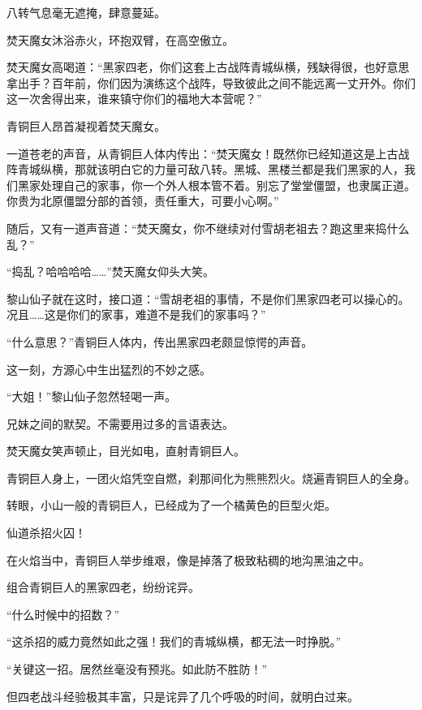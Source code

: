 
\begin{this_body}

八转气息毫无遮掩，肆意蔓延。

焚天魔女沐浴赤火，环抱双臂，在高空傲立。

焚天魔女高喝道：“黑家四老，你们这套上古战阵青城纵横，残缺得很，也好意思拿出手？百年前，你们因为演练这个战阵，导致彼此之间不能远离一丈开外。你们这一次舍得出来，谁来镇守你们的福地大本营呢？”

青铜巨人昂首凝视着焚天魔女。

一道苍老的声音，从青铜巨人体内传出：“焚天魔女！既然你已经知道这是上古战阵青城纵横，那就该明白它的力量可敌八转。黑城、黑楼兰都是我们黑家的人，我们黑家处理自己的家事，你一个外人根本管不着。别忘了堂堂僵盟，也隶属正道。你贵为北原僵盟分部的首领，责任重大，可要小心啊。”

随后，又有一道声音道：“焚天魔女，你不继续对付雪胡老祖去？跑这里来捣什么乱？”

“捣乱？哈哈哈哈……”焚天魔女仰头大笑。

黎山仙子就在这时，接口道：“雪胡老祖的事情，不是你们黑家四老可以操心的。况且……这是你们的家事，难道不是我们的家事吗？”

“什么意思？”青铜巨人体内，传出黑家四老颇显惊愕的声音。

这一刻，方源心中生出猛烈的不妙之感。

“大姐！”黎山仙子忽然轻喝一声。

兄妹之间的默契。不需要用过多的言语表达。

焚天魔女笑声顿止，目光如电，直射青铜巨人。

青铜巨人身上，一团火焰凭空自燃，刹那间化为熊熊烈火。烧遍青铜巨人的全身。

转眼，小山一般的青铜巨人，已经成为了一个橘黄色的巨型火炬。

仙道杀招火囚！

在火焰当中，青铜巨人举步维艰，像是掉落了极致粘稠的地沟黑油之中。

组合青铜巨人的黑家四老，纷纷诧异。

“什么时候中的招数？”

“这杀招的威力竟然如此之强！我们的青城纵横，都无法一时挣脱。”

“关键这一招。居然丝毫没有预兆。如此防不胜防！”

但四老战斗经验极其丰富，只是诧异了几个呼吸的时间，就明白过来。


\end{this_body}
